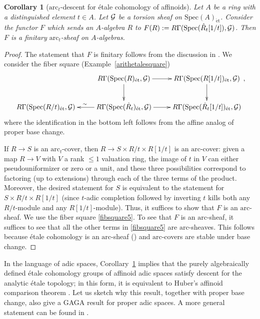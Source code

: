 \documentclass[reqno]{amsart}
\newcommand{\spec}{\mathrm{Spec}}
\newcommand{\et}{\mathrm{\acute{e}t}}
\newcommand{\arc}{\mathrm{arc}}
\newtheorem{corollary}[theorem]{Corollary}
\theoremstyle{definition}
\begin{document}
\begin{corollary}[$\arc_t$-descent for \'etale cohomology of affinoids]
\label{BerkDescent}
\label{BerkDesc2}
Let $A$ be a ring with a distinguished element $t \in A$. 
Let $\mathcal{G}$ be a torsion sheaf on $\spec(A)_{\et}$. Consider the functor 
$F$ which sends an $A$-algebra $R$ to $F(R) := R \Gamma( \spec(\hat{R}_t[1/t]),
\sG)$. Then $F$ is a
finitary $\arc_t$-sheaf on $A$-algebras.
\end{corollary} 
\begin{proof} 
The statement that $F$ is finitary follows from
the discussion in 
.
We consider the fiber square 
(Example~\ref{arithetalesquare}) 
\begin{equation} \label{fibsquare5} \xymatrix{
& R \Gamma( \spec(R)_{\et}, \mathcal{G}) \ar[d]  \ar[r] & R \Gamma( \spec(R[1/t])_{\et},
\mathcal{G}) \ar[d]  \\
R \Gamma( \spec( R/t)_{\et}, \mathcal{G})
& \ar[l]_{\sim} R \Gamma( \spec( \hat{R}_t)_{\et}, \mathcal{G}) \ar[r] & R \Gamma(
\spec(\hat{R}_t[1/t])_{\et} , \mathcal{G})
}, \end{equation}
where the identification in the bottom left  follows from the affine analog of
proper base change. 



If $R \to S$ is an $\arc_t$-cover, then $R \to S \times R/t \times R[1/t]$ is an
$\arc$-cover: given a map $R \to V$ with $V$ a rank $\leq 1$ valuation ring, the
image of $t$ in $V$ can either pseudouniformizer or zero or a unit, and these
three possibilities correspond to factoring (up to extensions) through each of
the three terms of the product. Moreover, the desired statement for $S$ is equivalent to the
statement for $S \times R/t \times R[1/t]$ (since $t$-adic completion followed
by inverting $t$ kills both any $R/t$-module and any $R[1/t]$-module). Thus, it
suffices to show that $F$ is an $\arc$-sheaf.
We use the fiber square \eqref{fibsquare5}. 
To see that $F$ is an $\arc$-sheaf, it suffices to see that all the other terms
in \eqref{fibsquare5} are $\arc$-sheaves. This follows because
\'etale cohomology is an $\arc$-sheaf () and $\arc$-covers are stable
under base change. \end{proof} 

In the language of adic spaces, Corollary~\ref{BerkDescent} implies that the purely algebraically defined \'etale cohomology groups of affinoid adic spaces satisfy descent for the analytic \'etale topology; in this form, it is equivalent to Huber's affinoid comparison theorem \cite[Corollary 3.2.2]{HuberBook}. Let us sketch why this result, together with proper base change, also give a GAGA result for proper adic spaces. A more general statement can be found in \cite[Theorem 3.2.10]{HuberBook}.
\end{document}
